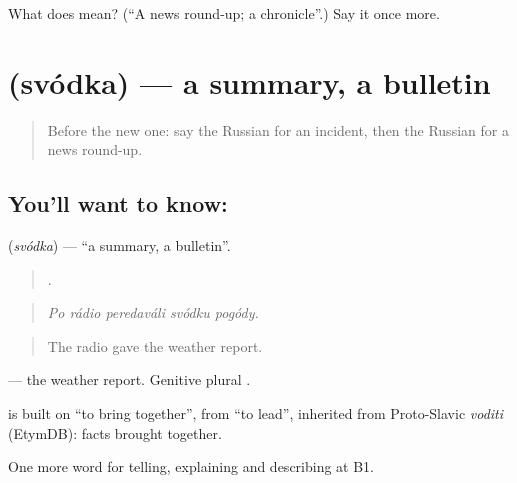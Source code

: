 \begin{tcolorbox}[breakable,colback=teal!4,colframe=teal!35!black,title={Before you move on}]
What does  mean? (\textquotedblleft{}A news round-up; a chronicle\textquotedblright{}.) Say it once more.
\end{tcolorbox}
\section[\texorpdfstring{\ru{сводка} (svódka)}{сводка (svódka)}]{ (svódka) — a summary, a bulletin}

\label{lesson:RU-C285-svodka}



\begin{quote}
Before the new one: say the Russian for an incident, then the Russian for a news round-up.
\end{quote}

\subsection*{You'll want to know: }
\textbf{} (\emph{svódka}) — \textquotedblleft{}a summary, a bulletin\textquotedblright{}.

\begin{quote}
    .
\end{quote}

\begin{quote}
\emph{Po rádio peredaváli svódku pogódy.}
\end{quote}

\begin{quote}
The radio gave the weather report.
\end{quote}

\emph{ } — the weather report. Genitive plural \emph{}.

\begin{cousinweb}
\emph{} is built on \emph{} \textquotedblleft{}to bring together\textquotedblright{}, from \emph{} \textquotedblleft{}to lead\textquotedblright{}, inherited from Proto-Slavic \emph{voditi} (EtymDB): facts brought together.
\end{cousinweb}

\begin{grammarlens}[title={What you've built}]
One more word for telling, explaining and describing at B1.
\end{grammarlens}

